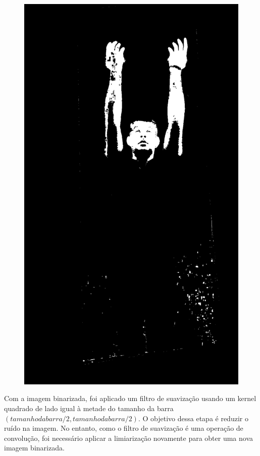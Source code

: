 \begin{figure}[H]
\begin{minipage}{\sizeImg\textwidth}
            \includegraphics[width=\textwidth]{figuras/mao_barra/limited.png}
        \end{minipage}
    \label{fig:gray_limited}
\end{figure}


Com a imagem binarizada, foi aplicado um filtro de suavização usando um kernel quadrado de lado igual à metade do tamanho da barra $(tamanho da barra/2, tamanho da barra/2)$. O objetivo dessa etapa é reduzir o ruído na imagem. No entanto, como o filtro de suavização é uma operação de convolução, foi necessário aplicar a limiarização novamente para obter uma nova imagem binarizada.

